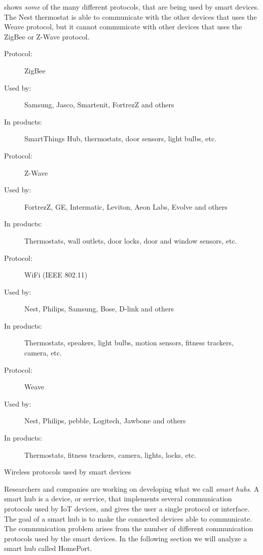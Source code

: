  shows \emph{some} of the many different protocols, 
that are being used by smart devices. 
The Nest thermostat is able to communicate with the other devices that uses the Weave protocol, 
but it cannot communicate with other devices that uses \eg the ZigBee or Z-Wave protocol. 

\begin{table}[!htb]
  \begin{description}
    \item[Protocol:] ZigBee
    \item[Used by:] Samsung, Jasco, Smartenit, FortrezZ and others
    \item[In products:] SmartThings Hub, thermostats, door sensors, light bulbs, etc.\\
    
    \item[Protocol:] Z-Wave
    \item[Used by:] FortrezZ, GE, Intermatic, Leviton, Aeon Labs, Evolve and others
    \item[In products:] Thermostats, wall outlets, door locks, door and window sensors, etc.  \\
    
    \item[Protocol:] WiFi (IEEE 802.11)
    \item[Used by:] Nest, Philips, Samsung, Bose, D-link and others
    \item[In products:] Thermostats, speakers, light bulbs, motion sensors, fitness trackers, camera, etc. \\
    
    \item[Protocol:] Weave
    \item[Used by:] Nest, Philips, pebble, Logitech, Jawbone and others
    \item[In products:] Thermostats, fitness trackers, camera, lights, locks, etc. 
  \end{description}
  \caption{Wireless protocols used by smart devices}\label{table:iotprotocols}
\end{table}

Researchers and companies are working on developing what we call \emph{smart hubs}. 
A smart hub is a device, or service, that implements several communication protocols used by IoT devices, 
and gives the user a single protocol or interface. 
The goal of a smart hub is to make the connected devices able to communicate.
The communication problem arises from the number of different communication protocols used by the smart devices. 
In the following section we will analyze a smart hub called HomePort. 

